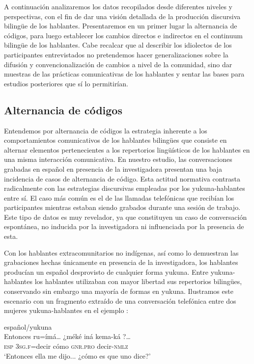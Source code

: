 \documentclass[output=paper]{langscibook}
\begin{document}
A continuación analizaremos los datos recopilados desde diferentes niveles y perspectivas, con el fin de dar una visión detallada de la producción discursiva bilingüe de los hablantes. Presentaremos en un primer lugar la alternancia de códigos, para luego establecer los cambios directos e indirectos en el continuum bilingüe de los hablantes. Cabe recalcar que al describir los idiolectos de los participantes entrevistados no pretendemos hacer generalizaciones sobre la difusión y convencionalización de cambios a nivel de la comunidad, sino dar muestras de las prácticas comunicativas de los hablantes y sentar las bases para estudios posteriores que sí lo permitirían.

\subsection{Alternancia de códigos}


Entendemos por alternancia de códigos la estrategia inherente a los comportamientos comunicativos de los hablantes bilingües que consiste en alternar elementos pertenecientes a los repertorios lingüísticos de los hablantes en una misma interacción comunicativa.  En nuestro estudio, las conversaciones grabadas en español en presencia de la investigadora presentan una baja incidencia de casos de alternancia de código. Esta actitud normativa contrasta radicalmente con las estrategias discursivas empleadas por los yukuna-hablantes entre sí. El caso más común es el de las llamadas telefónicas que recibían los participantes mientras estaban siendo grabados durante una sesión de trabajo. Este tipo de datos es muy revelador, ya que constituyen un caso de conversación espontánea, no inducida por la investigadora ni influenciada por la presencia de esta. 

Con los hablantes extracomunitarios no indígenas, así como lo demuestran las grabaciones hechas únicamente en presencia de la investigadora, los hablantes producían un español desprovisto de cualquier forma yukuna. Entre yukuna-hablantes los hablantes utilizaban con mayor libertad sus repertorios bilingües, conservando sin embargo una mayoría de formas en yukuna. Ilustramos este escenario con un fragmento extraído de una conversación telefónica entre dos mujeres yukuna-hablantes en el ejemplo :

\ea\label{ex:lemus:1}
{español/yukuna}\\
\ea
\gll Entonces ru=ímá…             ¿méké iná kema-ká ?…\\
\textsc{esp} \textsc{3sg.f=}decir cómo \textsc{gnr.pro}  {decir}\textsc{-nmlz}\\
\glt `Entonces ella me dijo... ¿cómo es que uno dice?'
\end{document}
